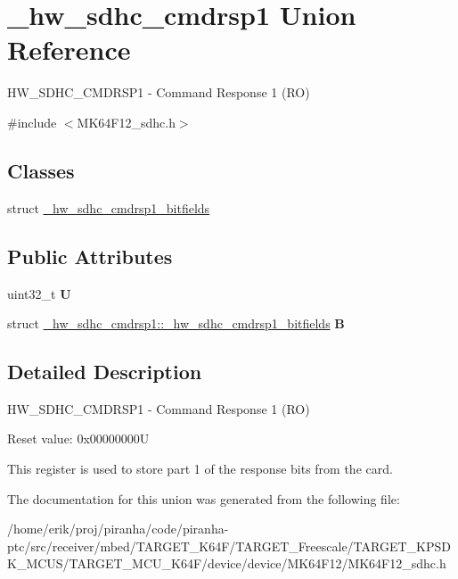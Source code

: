 \hypertarget{union__hw__sdhc__cmdrsp1}{}\section{\+\_\+hw\+\_\+sdhc\+\_\+cmdrsp1 Union Reference}
\label{union__hw__sdhc__cmdrsp1}


H\+W\+\_\+\+S\+D\+H\+C\+\_\+\+C\+M\+D\+R\+S\+P1 -\/ Command Response 1 (RO)  




{\ttfamily \#include $<$M\+K64\+F12\+\_\+sdhc.\+h$>$}

\subsection*{Classes}
\begin{DoxyCompactItemize}
\item 
struct \hyperlink{struct__hw__sdhc__cmdrsp1_1_1__hw__sdhc__cmdrsp1__bitfields}{\+\_\+hw\+\_\+sdhc\+\_\+cmdrsp1\+\_\+bitfields}
\end{DoxyCompactItemize}
\subsection*{Public Attributes}
\begin{DoxyCompactItemize}
\item 
uint32\+\_\+t {\bfseries U}\hypertarget{union__hw__sdhc__cmdrsp1_ad18161719671c67695d6fb4296851c2d}{}\label{union__hw__sdhc__cmdrsp1_ad18161719671c67695d6fb4296851c2d}

\item 
struct \hyperlink{struct__hw__sdhc__cmdrsp1_1_1__hw__sdhc__cmdrsp1__bitfields}{\+\_\+hw\+\_\+sdhc\+\_\+cmdrsp1\+::\+\_\+hw\+\_\+sdhc\+\_\+cmdrsp1\+\_\+bitfields} {\bfseries B}\hypertarget{union__hw__sdhc__cmdrsp1_ab08d14a7e59ebc3eae20cb59f63f0ed8}{}\label{union__hw__sdhc__cmdrsp1_ab08d14a7e59ebc3eae20cb59f63f0ed8}

\end{DoxyCompactItemize}


\subsection{Detailed Description}
H\+W\+\_\+\+S\+D\+H\+C\+\_\+\+C\+M\+D\+R\+S\+P1 -\/ Command Response 1 (RO) 

Reset value\+: 0x00000000U

This register is used to store part 1 of the response bits from the card. 

The documentation for this union was generated from the following file\+:\begin{DoxyCompactItemize}
\item 
/home/erik/proj/piranha/code/piranha-\/ptc/src/receiver/mbed/\+T\+A\+R\+G\+E\+T\+\_\+\+K64\+F/\+T\+A\+R\+G\+E\+T\+\_\+\+Freescale/\+T\+A\+R\+G\+E\+T\+\_\+\+K\+P\+S\+D\+K\+\_\+\+M\+C\+U\+S/\+T\+A\+R\+G\+E\+T\+\_\+\+M\+C\+U\+\_\+\+K64\+F/device/device/\+M\+K64\+F12/M\+K64\+F12\+\_\+sdhc.\+h\end{DoxyCompactItemize}
